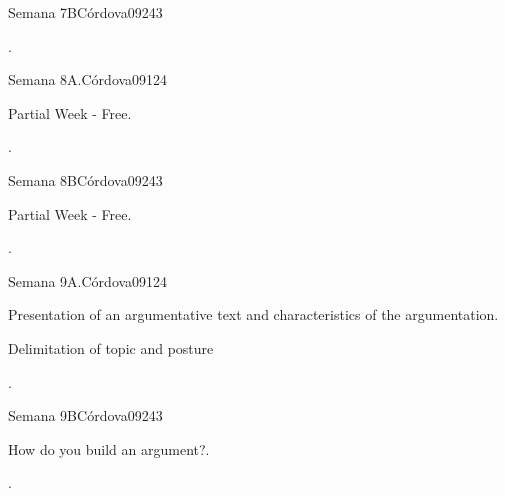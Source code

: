 \begin{syllabus}
\begin{unit}{Semana 7B}{}{Córdova09}{24}{3}
   \begin{learningoutcomes}
      \item . 
      \end{learningoutcomes}
\end{unit}


\begin{unit}{Semana 8A.}{}{Córdova09}{12}{4}
   \begin{topics}
      \item Partial Week - Free.
   \end{topics}
   \begin{learningoutcomes}
      \item .
   \end{learningoutcomes}
\end{unit}

\begin{unit}{Semana 8B}{}{Córdova09}{24}{3}
   \begin{topics}
      \item Partial Week - Free.
   \end{topics}

   \begin{learningoutcomes}
      \item .
      \end{learningoutcomes}
\end{unit}


\begin{unit}{Semana 9A.}{}{Córdova09}{12}{4}
   \begin{topics}
      \item Presentation of an argumentative text and characteristics of the argumentation.
      \item Delimitation of topic and posture

   \end{topics}
   \begin{learningoutcomes}
      \item .
   \end{learningoutcomes}
\end{unit}

\begin{unit}{Semana 9B}{}{Córdova09}{24}{3}
   \begin{topics}
      \item How do you build an argument?.
   \end{topics}

   \begin{learningoutcomes}
      \item .
      \end{learningoutcomes}
\end{unit}



\end{syllabus}
